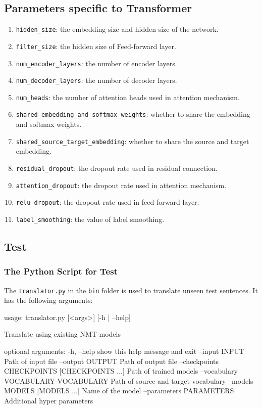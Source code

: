 \documentclass{article}
\begin{document}
\subsection{Parameters specific to Transformer}
\begin{enumerate}
\item \verb|hidden_size|: the embedding size and hidden size of the network.
\item \verb|filter_size|: the hidden size of Feed-forward layer.
\item \verb|num_encoder_layers|: the number of encoder layers.
\item \verb|num_decoder_layers|: the number of decoder layers.
\item \verb|num_heads|: the number of attention heads used in attention mechanism.
\item \verb|shared_embedding_and_softmax_weights|: whether to share the embedding and softmax weights.
\item \verb|shared_source_target_embedding|: whether to share the source and target embedding.
\item \verb|residual_dropout|: the dropout rate used in residual connection.
\item \verb|attention_dropout|: the dropout rate used in attention mechanism.
\item\verb|relu_dropout|: the dropout rate used in feed forward layer.
\item \verb|label_smoothing|: the value of label smoothing.
\end{enumerate}


\subsection{Test}
\subsubsection{The Python Script for Test}
The \verb|translator.py| in the \verb|bin| folder is used to translate unseen test sentences. It has the following arguments:

\begin{everbatim}
usage: translator.py [<args>] [-h | --help]

Translate using existing NMT models

optional arguments:
  -h, --help            show this help message and exit
  --input INPUT         Path of input file
  --output OUTPUT       Path of output file
  --checkpoints CHECKPOINTS [CHECKPOINTS ...]
                        Path of trained models
  --vocabulary VOCABULARY VOCABULARY
                        Path of source and target vocabulary
  --models MODELS [MODELS ...]
                        Name of the model
  --parameters PARAMETERS
                        Additional hyper parameters
\end{everbatim}
\end{document}
